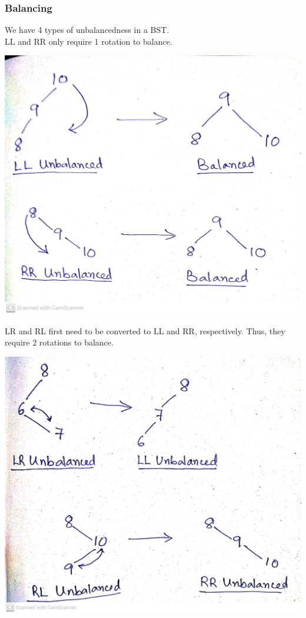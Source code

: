 \documentclass[10pt, a4paper]{extarticle}
\theoremstyle{definition}
\begin{document}
\subsubsection{Balancing}
We have 4 types of unbalancedness in a BST.\\
LL and RR only require 1 rotation to balance.
\begin{center}
	\includegraphics[scale=0.09]{LL-RR.jpg}\\
\end{center}
LR and RL first need to be converted to LL and RR, respectively. Thus, they require 2 rotations to balance.
\begin{center}
	\includegraphics[scale=0.08]{LR-RL.jpg}\\
\end{center}
\end{document}
